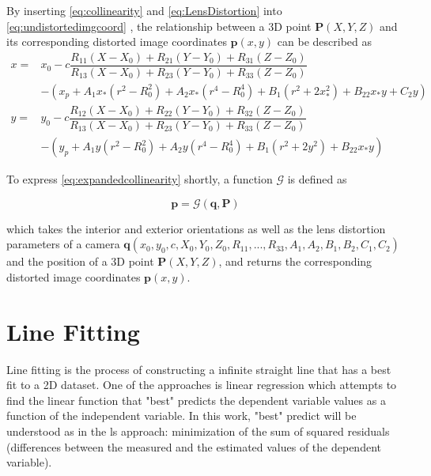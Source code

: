 By inserting \eqref{eq:collinearity} and \eqref{eq:LensDistortion} into \eqref{eq:undistortedimgcoord} , the relationship between a 3D point $\mathbf{P}(X, Y, Z)$ and its corresponding distorted image coordinates $\mathbf{p}(x,y)$ can be described as
\begin{equation} \label{eq:expandedcollinearity}
\begin{split}
x =& x_0-c\dfrac{R_{11}(X-X_0)+R_{21}(Y-Y_0)+R_{31}(Z-Z_0)}{R_{13}(X-X_0)+R_{23}(Y-Y_0)+R_{33}(Z-Z_0)} \\
&-(x_p + A_1x_*(r^2-R_0^2) + A_2x_*(r^4-R_0^4) + B_1(r^2+2x_*^2) + B_22x_*y+C_2y)\\
y =& y_0-c\dfrac{R_{12}(X-X_0)+R_{22}(Y-Y_0)+R_{32}(Z-Z_0)}{R_{13}(X-X_0)+R_{23}(Y-Y_0)+R_{33}(Z-Z_0)} \\
&-(y_p + A_1y  (r^2-R_0^2) + A_2y  (r^4-R_0^4) + B_1(r^2+2y^2)   + B_22x_*y)
\end{split}
\end{equation}

To express \eqref{eq:expandedcollinearity} shortly, a function $\mathcal{G}$ is defined as

\begin{equation} \label{eq:Gfunction}
\mathbf{p} = \mathcal{G}(\mathbf{q},\mathbf{P}) 
\end{equation}

which takes the interior and exterior orientations as well as the lens distortion parameters of a camera $\mathbf{q}(x_0,y_0,c,X_0,Y_0,Z_0,R_{11},...,R_{33},A_1,A_2,B_1,B_2,C_1,C_2)$ and the position of a 3D point $\mathbf{P}(X, Y, Z)$, and returns the corresponding distorted image coordinates $\mathbf{p}(x,y)$.


\section{Line Fitting}
\label{sec:LineFitting}

Line fitting is the process of constructing a infinite straight line that has a best fit to a 2D dataset. One of the approaches is linear regression which attempts to find the linear function that "best" predicts the dependent variable values as a function of the independent variable. In this work, "best" predict will be understood as in the \gls{ls} approach: minimization of the sum of squared residuals (differences between the measured and the estimated values of the dependent variable).

